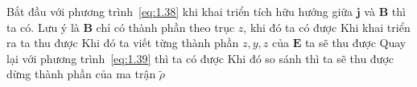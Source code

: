     \begin{more}
        Bắt đầu với phương trình~\eqref{eq:1.38} khi khai triển tích hữu hướng giữa $\mathbf{j}$ và $\mathbf{B}$ thì ta có. Lưu ý là $\mathbf{B}$ chỉ có thành phần theo trục $z$, khi đó ta có được
        Khi khai triển ra ta thu được
        Khi đó ta viết từng thành phần $z, y, z$ của $\mathbf{E}$ ta sẽ thu được
        Quay lại với phương trình~\eqref{eq:1.39} thì ta có được 
        Khi đó so sánh thì ta sẽ thu được dừng thành phần của ma trận $\tilde{\rho}$
    \end{more}

